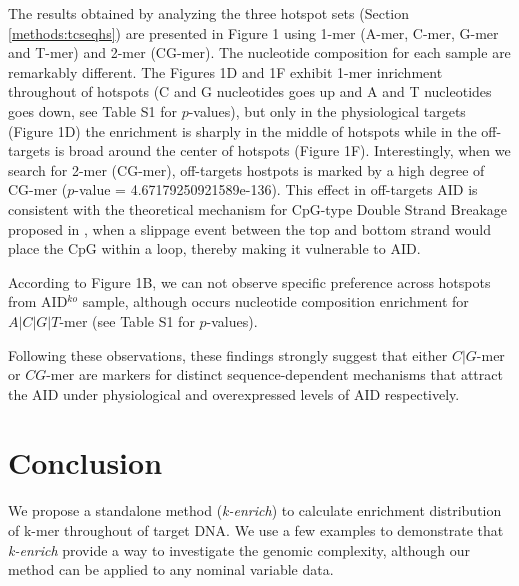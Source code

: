 \documentclass{bioinfo}
\begin{document}
The results obtained by analyzing the three hotspot sets (Section
\ref{methods:tcseqhs}) are presented in Figure 1 using 1-mer (A-mer, C-mer,
G-mer and T-mer) and 2-mer (CG-mer). The nucleotide composition for each
sample are remarkably different. The Figures 1D and 1F exhibit 1-mer
inrichment throughout of hotspots (C and G nucleotides goes up and A and T
nucleotides goes down, see Table S1 for $p$-values), but only in the
physiological targets (Figure 1D) the enrichment is sharply in the middle of
hotspots while in the off-targets is broad around the center of hotspots
(Figure 1F). Interestingly, when we search for 2-mer (CG-mer), off-targets
hostpots is marked by a high degree of CG-mer ($p$-value =
4.67179250921589e-136). This effect in off-targets AID is consistent with the theoretical mechanism for CpG-type Double Strand Breakage proposed in \cite{pmid19070581}, when a slippage event between the top and bottom strand would place the CpG within a loop, thereby making it vulnerable to AID.

According to Figure 1B, we can not observe specific preference across hotspots from AID$^{ko}$ sample, although occurs nucleotide composition enrichment for $A|C|G|T$-mer (see Table S1 for $p$-values).

Following these observations, these findings strongly suggest that either $C|G$-mer or $CG$-mer are markers for distinct sequence-dependent mechanisms that attract the AID under physiological and overexpressed levels of AID respectively.

\section{Conclusion}
We propose a standalone method ({\it k-enrich}) to calculate enrichment distribution of k-mer throughout of target DNA. We use a few examples to demonstrate that {\it k-enrich} provide a way to investigate the genomic complexity, although our method can be applied to any nominal variable data.



\scriptsize{
   
\normalsize
}
\end{document}
